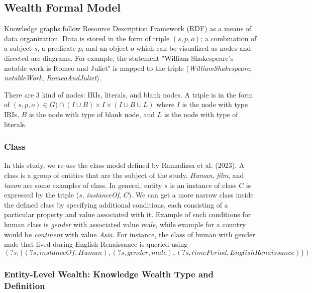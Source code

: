 \subsection{Wealth Formal Model}
Knowledge graphs follow Resource Description Framework (RDF) as a means of data organization. Data is stored in the form of triple \((s, p, o)\); a combination of a subject \(s\), a predicate \(p\), and an object \(o\) which can be visualized as nodes and directed-arc diagrams. For example, the statement "William Shakespeare's notable work is Romeo and Juliet" is mapped to the triple (\textit{WilliamShakespeare}, \textit{notableWork}, \textit{RomeoAndJuliet}).

There are 3 kind of nodes: IRIs, literals, and blank nodes. A triple is in the form of \((s, p, o) \in G) \cap (I \cup B) \times I \times (I \cup B \cup L) \) where \(I\) is the node with type IRIs, \(B\) is the node with type of blank node, and \(L\) is the node with type of literals.

\subsubsection{Class}
In this study, we re-use the class model defined by Ramadizsa et al. (2023). A class is a group of entities that are the subject of the study. \textit{Human}, \textit{film}, and \textit{taxon} are some examples of class. In general, entity \(s\) is an instance of class \(C\) is expressed by the triple (\(s\), \textit{instanceOf}, \(C\)). We can get a more narrow class inside the defined class by specifying additional conditions, each consisting of a particular property and value associated with it. Example of such conditions for human class is \textit{gender} with associated value \textit{male}, while example for a country would be \textit{continent} with value \textit{Asia}. For instance, the class of human with gender male that lived during English Renaissance is queried using
\[
    (?s, \{(?s, instanceOf, Human), (?s, gender, male), (?s, timePeriod, EnglishRenaissance)\})
\]

\subsubsection{Entity-Level Wealth: Knowledge Wealth Type and Definition}

